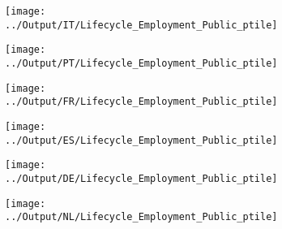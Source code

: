 \documentclass[12pt,notitlepage]{article}
\begin{document}
\begin{figure}[!htpb]
\centering
\caption{Employment Percentiles by Year (Public Firms in Orbis)}
\begin{subfigure}{.49\textwidth}
    \centering
 \texttt{[image: ../Output/IT/Lifecycle\_Employment\_Public\_ptile]}
\end{subfigure}%
\begin{subfigure}{.49\textwidth}
    \centering
 \texttt{[image: ../Output/PT/Lifecycle\_Employment\_Public\_ptile]}
\end{subfigure}
\begin{subfigure}{.49\textwidth}
    \centering
 \texttt{[image: ../Output/FR/Lifecycle\_Employment\_Public\_ptile]}
\end{subfigure}%
\begin{subfigure}{.49\textwidth}
    \centering
 \texttt{[image: ../Output/ES/Lifecycle\_Employment\_Public\_ptile]}
\end{subfigure}
\begin{subfigure}{.49\textwidth}
    \centering
 \texttt{[image: ../Output/DE/Lifecycle\_Employment\_Public\_ptile]}
\end{subfigure}
\begin{subfigure}{.49\textwidth}
    \centering
 \texttt{[image: ../Output/NL/Lifecycle\_Employment\_Public\_ptile]}
\end{subfigure}
\end{figure}
\pagebreak


\end{document}
